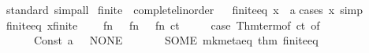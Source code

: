 \begin{isabellebody}
\isatagproof
{}\isamarkupfalse%
\ standard\ simp{\isacharunderscore}{\kern0pt}all%
\endisatagproof
{\isafoldproof}%
%
\isadelimproof
\isanewline
%
\endisadelimproof
\isanewline
{}\isamarkupfalse%
\ finite{\isacharunderscore}{\kern0pt}{}\ {\isacharcolon}{\kern0pt}{\isacharcolon}{\kern0pt}\ complete{\isacharunderscore}{\kern0pt}linorder%
\isadelimproof
\ %
\endisadelimproof
%
\isatagproof
\isacommand{{\isachardot}{\kern0pt}{\isachardot}{\kern0pt}}\isamarkupfalse%
%
\endisatagproof
{\isafoldproof}%
%
\isadelimproof
%
\endisadelimproof
\isanewline
\isanewline
{}\isamarkupfalse%
\ finite{\isacharunderscore}{\kern0pt}{}{\isacharunderscore}{\kern0pt}eq{\isacharcolon}{\kern0pt}\ {\isachardoublequoteopen}x\ {\isacharequal}{\kern0pt}\ a\isanewline
%
\isadelimproof
%
\endisadelimproof
%
\isatagproof
{}\isamarkupfalse%
{\isacharparenleft}{\kern0pt}cases\ x{\isacharparenright}{\kern0pt}\ simp%
\endisatagproof
{\isafoldproof}%
%
\isadelimproof
\isanewline
%
\endisadelimproof
%
\isadelimML
\isanewline
%
\endisadelimML
%
\isatagML
{}\isamarkupfalse%
\ finite{\isacharunderscore}{\kern0pt}{}{\isacharunderscore}{\kern0pt}eq\ {\isacharparenleft}{\kern0pt}{\isachardoublequoteopen}x{\isacharcolon}{\kern0pt}{\isacharcolon}{\kern0pt}finite{\isacharunderscore}{\kern0pt}{}{\isachardoublequoteclose}{\isacharparenright}{\kern0pt}\ {\isacharequal}{\kern0pt}\ {\isacartoucheopen}\isanewline
\ \ fn\ {\isacharunderscore}{\kern0pt}\ {\isacharequal}{\kern0pt}{\isachargreater}{\kern0pt}\ fn\ {\isacharunderscore}{\kern0pt}\ {\isacharequal}{\kern0pt}{\isachargreater}{\kern0pt}\ fn\ ct\ {\isacharequal}{\kern0pt}{\isachargreater}{\kern0pt}\isanewline
\ \ \ \ {\isacharparenleft}{\kern0pt}case\ Thm{\isachardot}{\kern0pt}term{\isacharunderscore}{\kern0pt}of\ ct\ of\isanewline
\ \ \ \ \ \ Const\ {\isacharparenleft}{\kern0pt}\isactrlconstUNDERSCOREname {\isasymopen}a\ {\isacharunderscore}{\kern0pt}{\isacharparenright}{\kern0pt}\ {\isacharequal}{\kern0pt}{\isachargreater}{\kern0pt}\ NONE\isanewline
\ \ \ \ {\isacharbar}{\kern0pt}\ {\isacharunderscore}{\kern0pt}\ {\isacharequal}{\kern0pt}{\isachargreater}{\kern0pt}\ SOME\ {\isacharparenleft}{\kern0pt}mk{\isacharunderscore}{\kern0pt}meta{\isacharunderscore}{\kern0pt}eq\ {\isacharat}{\kern0pt}{\isacharbraceleft}{\kern0pt}thm\ finite{\isacharunderscore}{\kern0pt}{}{\isacharunderscore}{\kern0pt}eq{\isacharbraceright}{\kern0pt}{\isacharparenright}{\kern0pt}{\isacharparenright}{\kern0pt}\isanewline

\end{isabellebody}

